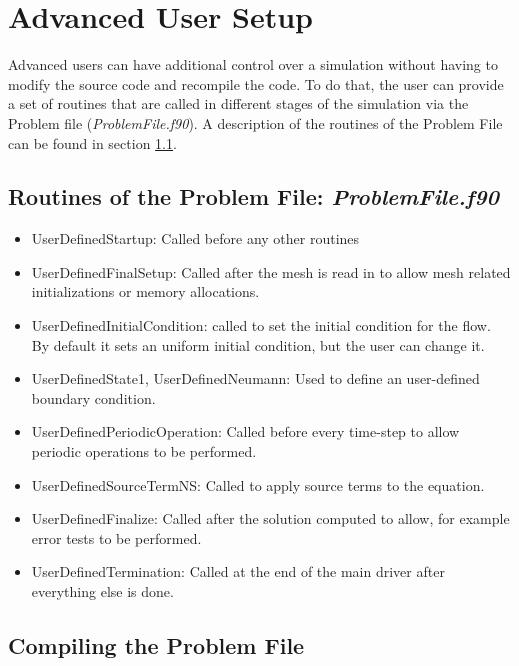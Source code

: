 \documentclass[a4paper,10pt]{report}
\begin{document}
\chapter{Advanced User Setup}

Advanced users can have additional control over a simulation without having to modify the source code and recompile the code. To do that, the user can provide a set of routines that are called in different stages of the simulation via the Problem file (\textit{ProblemFile.f90}). A description of the routines of the Problem File can be found in section \ref{sec:ProblemFile}.

\section{Routines of the Problem File: \textit{ProblemFile.f90}} \label{sec:ProblemFile}

\begin{itemize}
\item UserDefinedStartup: Called before any other routines

\item UserDefinedFinalSetup: Called after the mesh is read in to allow mesh related initializations or memory allocations.

\item UserDefinedInitialCondition: called to set the initial condition for the flow. By default it sets an uniform initial condition, but the user can change it.

\item UserDefinedState1, UserDefinedNeumann: Used to define an user-defined boundary condition.

\item UserDefinedPeriodicOperation: Called before every time-step to allow periodic operations to be performed.

\item UserDefinedSourceTermNS: Called to apply source terms to the equation.

\item UserDefinedFinalize: Called after the solution computed to allow, for example error tests to be performed.

\item UserDefinedTermination: Called at the end of the main driver after everything else is done.
\end{itemize}

\section{Compiling the Problem File}
\end{document}
